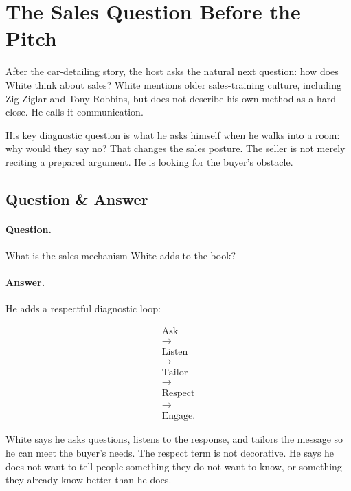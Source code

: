 \documentclass[11pt,oneside]{book}
\begin{document}
\section{The Sales Question Before the Pitch}

After the car-detailing story, the host asks the natural next question: how does White think about sales? White mentions older sales-training culture, including Zig Ziglar and Tony Robbins, but does not describe his own method as a hard close. He calls it communication.

His key diagnostic question is what he asks himself when he walks into a room: why would they say no? That changes the sales posture. The seller is not merely reciting a prepared argument. He is looking for the buyer's obstacle.

\subsection{Question \& Answer}

\paragraph{Question.}
What is the sales mechanism White adds to the book?

\paragraph{Answer.}
He adds a respectful diagnostic loop:

\begin{equation}
\begin{gathered}
\text{Ask}\\
\longrightarrow\\
\text{Listen}\\
\longrightarrow\\
\text{Tailor}\\
\longrightarrow\\
\text{Respect}\\
\longrightarrow\\
\text{Engage}.
\end{gathered}
\end{equation}

White says he asks questions, listens to the response, and tailors the message so he can meet the buyer's needs. The respect term is not decorative. He says he does not want to tell people something they do not want to know, or something they already know better than he does.
\end{document}
